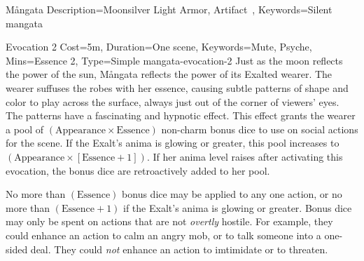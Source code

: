 \begin{Merit}{Mångata}{
    Description={Moonsilver Light Armor, Artifact~},
    Keywords=Silent
}{mangata}
\begin{Charm}{Evocation 2}{
    Cost=5m,
    Duration=One scene,
    Keywords={Mute, Psyche},
    Mins=Essence 2,
    Type=Simple
}{mangata-evocation-2}
Just as the moon reflects the power of the sun, Mångata reflects the power of
its Exalted wearer. The wearer suffuses the robes with her essence, causing
subtle patterns of shape and color to play across the surface, always just out
of the corner of viewers' eyes. The patterns have a fascinating and hypnotic
effect. This effect grants the wearer a pool of $(\mathrm{Appearance} \times
\mathrm{Essence})$ non-charm bonus dice to use on social actions for the scene.
If the Exalt's anima is glowing or greater, this pool increases to
$(\mathrm{Appearance} \times [\mathrm{Essence} + 1])$. If her anima level
raises after activating this evocation, the bonus dice are retroactively added
to her pool.

No more than $(\mathrm{Essence})$ bonus dice may be applied to any one action,
or no more than $(\mathrm{Essence} + 1)$ if the Exalt's anima is glowing or
greater. Bonus dice may only be spent on actions that are not \emph{overtly}
hostile. For example, they could enhance an action to calm an angry mob, or to
talk someone into a one-sided deal. They could \emph{not} enhance an action to
imtimidate or to threaten.
\end{Charm}
\end{Merit}


